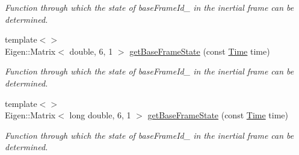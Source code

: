 \begin{DoxyCompactItemize}
\begin{DoxyCompactList}\small\item\em Function through which the state of base\+Frame\+Id\+\_\+ in the inertial frame can be determined. \end{DoxyCompactList}\item 
{\footnotesize template$<$$>$ }\\Eigen\+::\+Matrix$<$ double, 6, 1 $>$ \hyperlink{classtudat_1_1simulation__setup_1_1BaseStateInterface_a6c481834fbc606782ddc4edef418fb37}{get\+Base\+Frame\+State} (const \hyperlink{classtudat_1_1Time}{Time} time)\hypertarget{classtudat_1_1simulation__setup_1_1BaseStateInterface_a6c481834fbc606782ddc4edef418fb37}{}\label{classtudat_1_1simulation__setup_1_1BaseStateInterface_a6c481834fbc606782ddc4edef418fb37}

\begin{DoxyCompactList}\small\item\em Function through which the state of base\+Frame\+Id\+\_\+ in the inertial frame can be determined. \end{DoxyCompactList}\item 
{\footnotesize template$<$$>$ }\\Eigen\+::\+Matrix$<$ long double, 6, 1 $>$ \hyperlink{classtudat_1_1simulation__setup_1_1BaseStateInterface_afc84a9d6d3b0ae9708cb064dc0699c47}{get\+Base\+Frame\+State} (const \hyperlink{classtudat_1_1Time}{Time} time)\hypertarget{classtudat_1_1simulation__setup_1_1BaseStateInterface_afc84a9d6d3b0ae9708cb064dc0699c47}{}\label{classtudat_1_1simulation__setup_1_1BaseStateInterface_afc84a9d6d3b0ae9708cb064dc0699c47}

\begin{DoxyCompactList}\small\item\em Function through which the state of base\+Frame\+Id\+\_\+ in the inertial frame can be determined. \end{DoxyCompactList}\end{DoxyCompactItemize}
